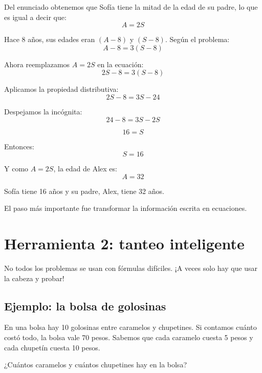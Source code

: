 \documentclass[12pt]{article}
\begin{document}
            Del enunciado obtenemos que Sofía tiene la mitad de la edad de su padre, lo que es igual a decir que:
            \[
                A=2S
            \]

            Hace 8 años, sus edades eran $(A-8)$ y $(S-8)$. Según el problema:
            \[
                A-8=3(S-8)
            \]

            Ahora reemplazamos \(A=2S\) en la ecuación:
            \[
                2S-8=3(S-8)
            \]

            Aplicamos la propiedad distributiva:
            \[
                2S-8=3S-24
            \]

            Despejamos la incógnita:
            \[
                24-8=3S-2S
            \]

            \[
                16=S
            \]

            Entonces:
            \[
                S=16
            \]

            Y como \(A=2S\), la edad de Alex es:
            \[
                A=32
            \]

            \begin{ejemplo}
                Sofía tiene 16 años y su padre, Alex, tiene 32 años.
            \end{ejemplo}

            \begin{idea}
                El paso más importante fue transformar la información escrita en ecuaciones.
            \end{idea}

            \section{Herramienta 2: tanteo inteligente}
            No todos los problemas se usan con fórmulas difíciles. ¡A veces solo hay que usar la cabeza y probar!

            \subsection{Ejemplo: la bolsa de golosinas}
            En una bolsa hay 10 golosinas entre caramelos y chupetines. Si contamos cuánto costó todo, la bolsa vale 70 pesos.
            Sabemos que cada caramelo cuesta 5 pesos y cada chupetín cuesta 10 pesos.

            \begin{desafio}
                ¿Cuántos caramelos y cuántos chupetines hay en la bolsa?
            \end{desafio}
\end{document}
